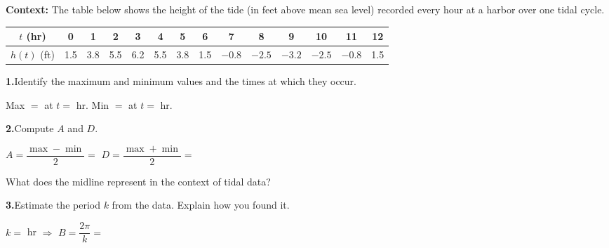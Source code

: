 \documentclass[10pt]{article}
\begin{document}
\vspace{0.08in}

\begin{tcolorbox}[colback=white, colframe=black!40,
    title=\textbf{Tier A --- Apply},
    fonttitle=\bfseries, arc=2mm, left=3mm, right=3mm, top=2mm, bottom=2mm]

\textbf{Context:} The table below shows the height of the tide (in feet above
mean sea level) recorded every hour at a harbor over one tidal cycle.

\vspace{4pt}
\begin{center}
\renewcommand{\arraystretch}{1.35}
\small
\begin{tabular}{|c|c|c|c|c|c|c|c|c|c|c|c|c|c|}
\hline
$t$ (hr) & 0 & 1 & 2 & 3 & 4 & 5 & 6 & 7 & 8 & 9 & 10 & 11 & 12 \\
\hline
$h(t)$ (ft) & 1.5 & 3.8 & 5.5 & 6.2 & 5.5 & 3.8 & 1.5 & $-0.8$ & $-2.5$ & $-3.2$ & $-2.5$ & $-0.8$ & 1.5 \\
\hline
\end{tabular}
\end{center}

\vspace{6pt}
\textbf{1.}\quad Identify the maximum and minimum values and the times at which they occur.

Max $= $ \underline{\hspace{1.5cm}} at $t = $ \underline{\hspace{1.2cm}} hr.
\quad Min $= $ \underline{\hspace{1.5cm}} at $t = $ \underline{\hspace{1.2cm}} hr.

\vspace{6pt}
\textbf{2.}\quad Compute $A$ and $D$.

$A = \dfrac{\max - \min}{2} = $ \underline{\hspace{3cm}} \qquad
$D = \dfrac{\max + \min}{2} = $ \underline{\hspace{3cm}}

What does the midline represent in the context of tidal data? \writeline

\vspace{6pt}
\textbf{3.}\quad Estimate the period $k$ from the data. Explain how you found it.

$k = $ \underline{\hspace{1.5cm}} hr \quad $\Rightarrow$ \quad $B = \dfrac{2\pi}{k} = $ \underline{\hspace{3cm}}


\end{tcolorbox}
\end{document}
